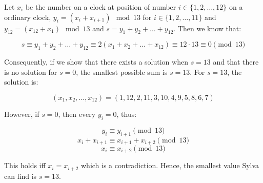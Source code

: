 \documentclass{fkssolpub}
\author{Ondřej Sedláček}
\begin{document}
Let $x_i$ be the number on a clock at position of number $i \in \{1, 2, \dots, 12\}$ on a ordinary clock, $y_i = (x_i + x_{i+1}) \mod 13$ for $i \in \{1, 2, \dots, 11\}$ and $y_{12} = (x_{12} + x_1) \mod 13$ and $s = y_1 + y_2 + \dots + y_{12}$. Then we know that:

\[
  s \equiv y_1 + y_2 + \dots + y_{12} \equiv 2 (x_1 + x_2 + \dots + x_{12}) \equiv 12 \cdot 13 \equiv 0 \pmod{13}
\]

Consequently, if we show that there exists a solution when $s = 13$ and that there is no solution for $s = 0$, the smallest possible sum is $s = 13$. For $s = 13$, the solution is:

\[
  (x_1, x_2, \dots, x_{12}) = (1, 12, 2, 11, 3, 10, 4, 9, 5, 8, 6, 7)
\]

However, if $s = 0$, then every $y_{i} = 0$, thus:

\[
  y_i \equiv y_{i + 1} \pmod{13}
\]
\[
  x_i + x_{i + 1} \equiv x_{i + 1} + x_{i + 2} \pmod{13}
\]
\[
  x_i \equiv x_{i + 2} \pmod{13}
\]

This holds iff $x_i = x_{i + 2}$ which is a contradiction. Hence, the smallest value Sylva can find is $s = 13$.
\end{document}
